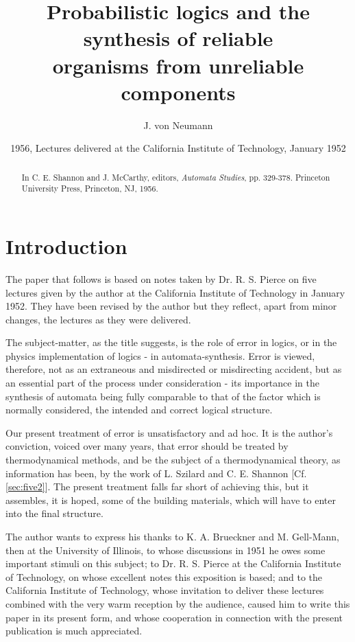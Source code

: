 \documentclass[twocolumn,preprintnumbers,amsmath,amssymb,floatfix]{revtex4}
\begin{document}


\title{Probabilistic logics and the synthesis
of reliable\\ organisms from unreliable components}

\author{J. von Neumann}

\date{1956, Lectures delivered at the California Institute of Technology, January 1952}

\begin{abstract}
\noindent In C. E. Shannon and J. McCarthy, editors,
\emph{Automata Studies}, pp. 329-378. Princeton University Press,
Princeton, NJ, 1956.
\end{abstract}

\maketitle

\section{\label{sec:one}Introduction}

The paper that follows is based on notes taken by Dr. R. S. Pierce
on five lectures given by the author at the California Institute
of Technology in January 1952. They have been revised by the
author but they reflect, apart from minor changes, the lectures as
they were delivered.

The subject-matter, as the title suggests, is the role of error in
logics, or in the physics implementation of logics - in
automata-synthesis. Error is viewed, therefore, not as an
extraneous and misdirected or misdirecting accident, but as an
essential part of the process under consideration - its importance
in the synthesis of automata being fully comparable to that of the
factor which is normally considered, the intended and correct
logical structure.

Our present treatment of error is unsatisfactory and ad hoc. It is
the author's conviction, voiced over many years, that error should
be treated by thermodynamical methods, and be the subject of a
thermodynamical theory, as information has been, by the work of L.
Szilard and C. E. Shannon [Cf. \ref{sec:five2}]. The present
treatment falls far short of achieving this, but it assembles, it
is hoped, some of the building materials, which will have to enter
into the final structure.

The author wants to express his thanks to K. A. Brueckner and M.
Gell-Mann, then at the University of Illinois, to whose
discussions in 1951 he owes some important stimuli on this
subject; to Dr. R. S. Pierce at the California Institute of
Technology, on whose excellent notes this exposition is based; and
to the California Institute of Technology, whose invitation to
deliver these lectures combined with the very warm reception by
the audience, caused him to write this paper in its present form,
and whose cooperation in connection with the present publication
is much appreciated.
\end{document}
